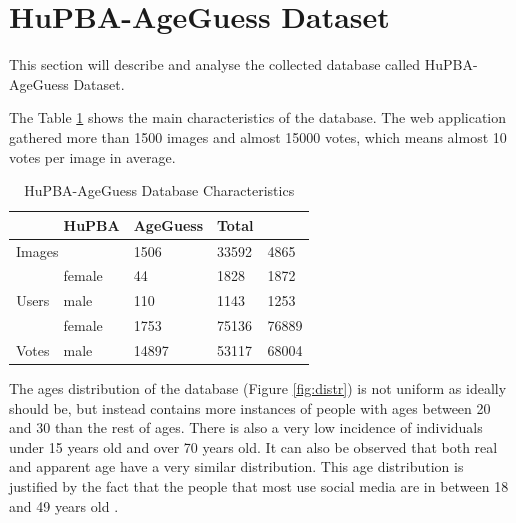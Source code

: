 \section{HuPBA-AgeGuess Dataset}

This section will describe and analyse the collected database called HuPBA-AgeGuess Dataset.  

The Table \ref{tab:charact} shows the main characteristics of the database. The web application gathered more than 1500 images and almost 15000 votes, which means almost 10 votes per image in average.

\begin{table}[h]
	\centering
	\begin{tabular}{|c|l|l|l|l|}
		\rowcolor[HTML]{EFEFEF} 
		\hline
		\multicolumn{2}{|l|}{\cellcolor[HTML]{EFEFEF}\textbf{Features}} & HuPBA & AgeGuess & Total \\ \hline
		\multicolumn{2}{|l|}{Images}                                    & 1506  & 33592 & 4865\\ \hline
		& female                & 44  & 1828 & 1872  \\ \cline{2-3} 
		\multirow{-2}{*}{Users}                 & male                  & 110 & 1143 & 1253 \\ \hline
		& female                & 1753  & 75136 & 76889\\ \cline{2-3} 
		\multirow{-2}{*}{Votes}                 & male                  & 14897 & 53117 & 68004\\ \hline
	\end{tabular}
	\caption{HuPBA-AgeGuess Database Characteristics}
	\label{tab:charact}
\end{table}
	
The ages distribution of the database (Figure \ref{fig:distr}) is not uniform as ideally should be, but instead contains more instances of people with ages between 20 and 30 than the rest of ages. There is also a very low incidence of individuals under 15 years old and over 70 years old. It can also be observed that both real and apparent age have a very similar distribution. This age distribution is justified by the fact that the people that most use social media are in between 18 and 49 years old \cite{brenner201372}.

